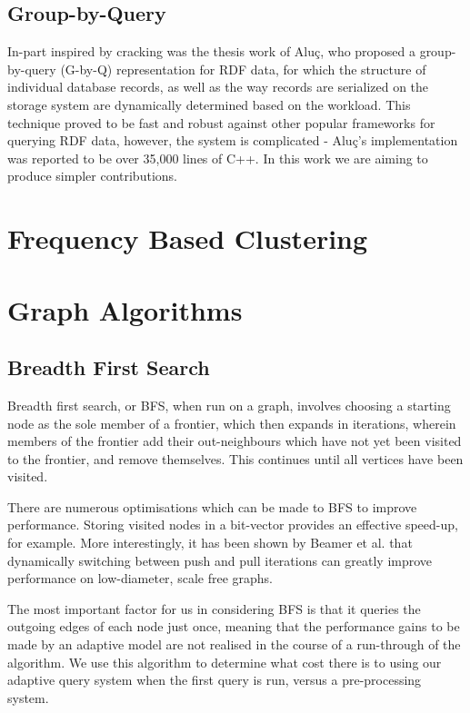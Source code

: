 \subsection{Group-by-Query}

In-part inspired by cracking was the thesis work of Aluç, who proposed a group-by-query (G-by-Q)
representation for RDF data, for which the structure of individual database records, as well as
the way records are serialized on the storage system are dynamically determined based on the
workload. This technique proved to be fast and robust against other popular frameworks for
querying RDF data, however, the system is complicated - Aluç's implementation was reported to be
over 35,000 lines of C++. In this work we are aiming to produce simpler contributions.

\section{Frequency Based Clustering}

\section{Graph Algorithms}

\subsection{Breadth First Search}

Breadth first search, or BFS, when run on a graph, involves choosing a starting node as the sole
member of a frontier, which then expands in iterations, wherein members of the frontier add their
out-neighbours which have not yet been visited to the frontier, and remove themselves. This continues
until all vertices have been visited.

There are numerous optimisations which can be made to BFS to improve performance. Storing visited
nodes in a bit-vector provides an effective speed-up, for example. More interestingly, it has been
shown by Beamer et al. that dynamically switching between push and pull iterations can greatly
improve performance on low-diameter, scale free graphs.

The most important factor for us in considering BFS is that it queries the outgoing edges of each
node just once, meaning that the performance gains to be made by an adaptive model are not realised
in the course of a run-through of the algorithm. We use this algorithm to determine what cost there
is to using our adaptive query system when the first query is run, versus a pre-processing system.

